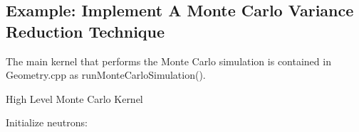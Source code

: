\documentclass[titlepage]{article}
\begin{document}
\subsection{Example: Implement A Monte Carlo Variance Reduction Technique}
The main kernel that performs the Monte Carlo simulation is contained in Geometry.cpp as runMonteCarloSimulation(). 

\begin{algorithm}

\caption{High Level Monte Carlo Kernel}
\begin{algorithmic}
\STATE Initialize neutrons:

\ENDFOR
\ENDFOR
\end{algorithmic}
\end{algorithm}
\end{document}
